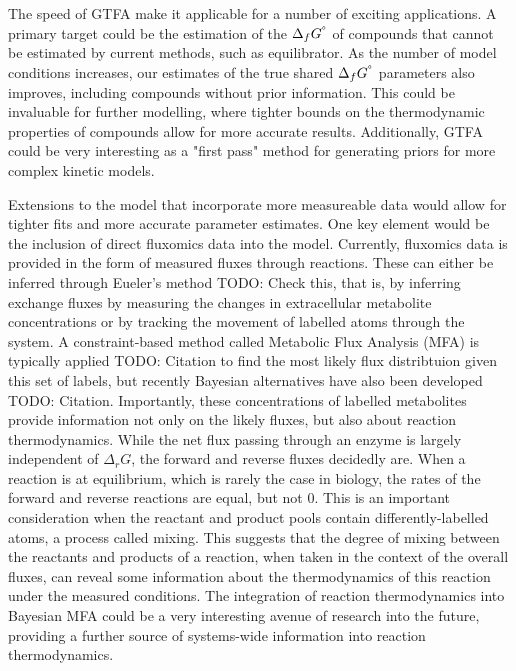 \documentclass[10pt,letterpaper]{article}
\newcommand{\sdgf}{\Delta_fG^{\degree}}
\newcommand{\dgr}{\Delta_rG}
\begin{document}
The speed of GTFA make it applicable for a number of exciting applications.
A primary target could be the estimation of the $\sdgf$ of compounds that cannot be estimated by current methods, such as equilibrator.
As the number of model conditions increases, our estimates of the true shared $\sdgf$ parameters also improves, including compounds without prior information.
This could be invaluable for further modelling, where tighter bounds on the thermodynamic properties of compounds allow for more accurate results.
Additionally, GTFA could be very interesting as a "first pass" method for generating priors for more complex kinetic models.

Extensions to the model that incorporate more measureable data would allow for tighter fits and more accurate parameter estimates.
One key element would be the inclusion of direct fluxomics data into the model.
Currently, fluxomics data is provided in the form of measured fluxes through reactions.
These can either be inferred through Eueler's method {TODO: Check this}, that is, by inferring exchange fluxes by measuring the changes in extracellular metabolite concentrations or by tracking the movement of labelled atoms through the system.
A constraint-based method called Metabolic Flux Analysis (MFA) is typically applied {TODO: Citation} to find the most likely flux distribtuion given this set of labels, but recently Bayesian alternatives have also been developed {TODO: Citation}.
Importantly, these concentrations of labelled metabolites provide information not only on the likely fluxes, but also about reaction thermodynamics.
While the net flux passing through an enzyme is largely independent of $\dgr$, the forward and reverse fluxes decidedly are.
When a reaction is at equilibrium, which is rarely the case in biology, the rates of the forward and reverse reactions are equal, but not 0.
This is an important consideration when the reactant and product pools contain differently-labelled atoms, a process called mixing. %
This suggests that the degree of mixing between the reactants and products of a reaction, when taken in the context of the overall fluxes, can reveal some information about the thermodynamics of this reaction under the measured conditions.
The integration of reaction thermodynamics into Bayesian MFA could be a very interesting avenue of research into the future, providing a further source of systems-wide information into reaction thermodynamics.
\end{document}
